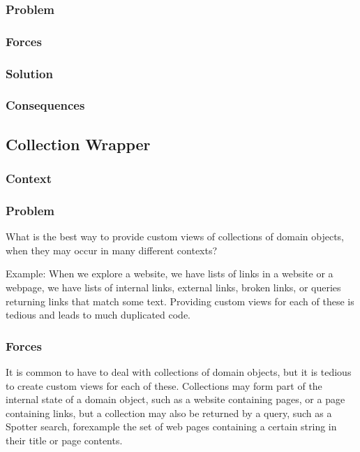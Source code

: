 \documentclass[sigconf]{acmart}
\begin{document}
\subsubsection*{Problem}
\subsubsection*{Forces}
\subsubsection*{Solution}
\subsubsection*{Consequences}


\subsection*{Collection Wrapper}\label{pat:collectionWrapper}
\subsubsection*{Context}
\subsubsection*{Problem}

What is the best way to provide custom views of collections of domain objects, when they may occur in many different contexts?

Example:
When we explore a website, we have lists of links in a website or a webpage, we have lists of internal links, external links, broken links, or queries returning links that match some text. Providing custom views for each of these is tedious and leads to much duplicated code.



\subsubsection*{Forces}

It is common to have to deal with collections of domain objects, but it is tedious to create custom views for each of these. Collections may form part of the internal state of a domain object, such as a website containing pages, or a page containing links, but a collection may also be returned by a query, such as a Spotter search, forexample the set of web pages containing a certain string in their title or page contents.
\end{document}
